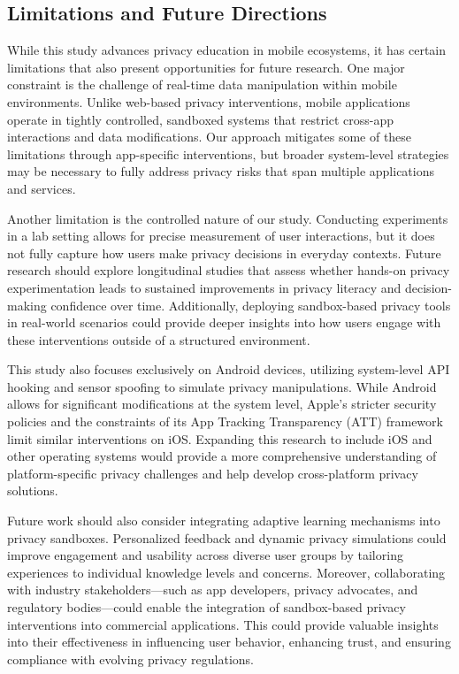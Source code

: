 \documentclass[acmlarge, nonacm]{acmart}
\begin{document}
\subsection{Limitations and Future Directions} 

While this study advances privacy education in mobile ecosystems, it has certain limitations that also present opportunities for future research. One major constraint is the challenge of real-time data manipulation within mobile environments. Unlike web-based privacy interventions, mobile applications operate in tightly controlled, sandboxed systems that restrict cross-app interactions and data modifications. Our approach mitigates some of these limitations through app-specific interventions, but broader system-level strategies may be necessary to fully address privacy risks that span multiple applications and services.  

Another limitation is the controlled nature of our study. Conducting experiments in a lab setting allows for precise measurement of user interactions, but it does not fully capture how users make privacy decisions in everyday contexts. Future research should explore longitudinal studies that assess whether hands-on privacy experimentation leads to sustained improvements in privacy literacy and decision-making confidence over time. Additionally, deploying sandbox-based privacy tools in real-world scenarios could provide deeper insights into how users engage with these interventions outside of a structured environment.  

This study also focuses exclusively on Android devices, utilizing system-level API hooking and sensor spoofing to simulate privacy manipulations. While Android allows for significant modifications at the system level, Apple’s stricter security policies and the constraints of its App Tracking Transparency (ATT) framework \cite{apple_att} limit similar interventions on iOS. Expanding this research to include iOS and other operating systems would provide a more comprehensive understanding of platform-specific privacy challenges and help develop cross-platform privacy solutions.  

Future work should also consider integrating adaptive learning mechanisms into privacy sandboxes. Personalized feedback and dynamic privacy simulations could improve engagement and usability across diverse user groups by tailoring experiences to individual knowledge levels and concerns. Moreover, collaborating with industry stakeholders—such as app developers, privacy advocates, and regulatory bodies—could enable the integration of sandbox-based privacy interventions into commercial applications. This could provide valuable insights into their effectiveness in influencing user behavior, enhancing trust, and ensuring compliance with evolving privacy regulations.  
\end{document}
